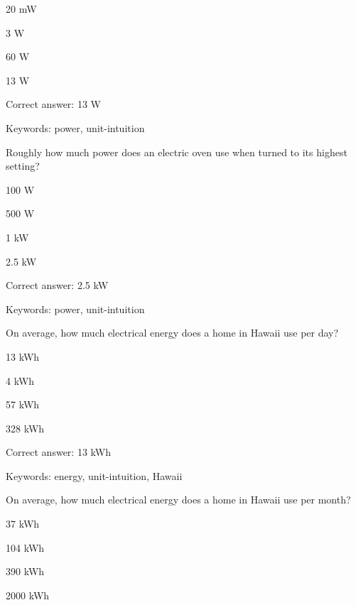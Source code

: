 \begin{answer}
	\item 20 mW
	\item 3 W
	\item 60 W
	\item 13 W
\end{answer}

Correct answer: 13 W

Keywords: power, unit-intuition

\begin{question}
	\item Roughly how much power does an electric oven use when turned to its highest setting?
\end{question}

\begin{answer}
	\item 100 W
	\item 500 W
	\item 1 kW
	\item 2.5 kW
\end{answer}

Correct answer: 2.5 kW

Keywords: power, unit-intuition

\begin{question}
	\item On average, how much electrical energy does a home in Hawaii use per day?
\end{question}

\begin{answer}
	\item 13 kWh
	\item 4 kWh
	\item 57 kWh
	\item 328 kWh
\end{answer}

Correct answer: 13 kWh

Keywords: energy, unit-intuition, Hawaii 

\begin{question}
	\item On average, how much electrical energy does a home in Hawaii use per month?
\end{question}

\begin{answer}
	\item 37 kWh
	\item 104 kWh
	\item 390 kWh
	\item 2000 kWh
\end{answer}

